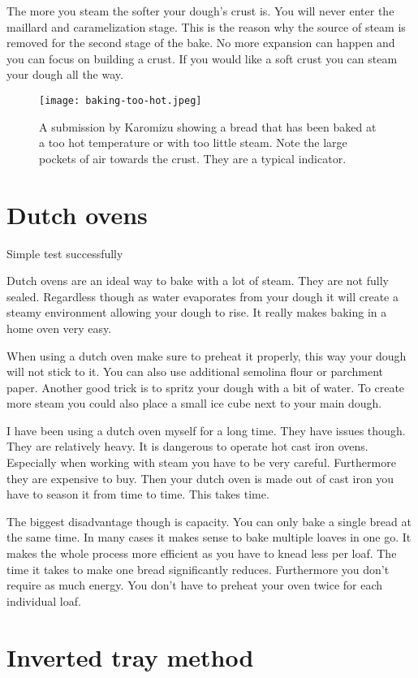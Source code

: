 The more you steam the softer your dough's crust is. You will never
enter the maillard and caramelization stage. This
is the reason why the source of steam is removed
for the second stage of the bake. No more expansion can
happen and you can focus on building a crust. If you
would like a soft crust you can steam your dough all the
way.

\begin{figure}[!htb]
  \texttt{[image: baking-too-hot.jpeg]}
  \caption{A submission by Karomizu showing a bread that has been baked
  at a too hot temperature or with too little steam. Note the large
  pockets of air towards the crust. They are a typical indicator.}
\end{figure}

\section{Dutch ovens}

Simple test successfully

Dutch ovens are an ideal way to bake with a lot of
steam. They are not fully sealed. Regardless though
as water evaporates from your dough it will create a steamy
environment allowing your dough to rise. It really
makes baking in a home oven very easy.

When using a dutch oven make sure to preheat it properly,
this way your dough will not stick to it. You can also
use additional semolina flour or parchment paper. Another
good trick is to spritz your dough with a bit of water.
To create more steam you could also place a small ice cube
next to your main dough.

I have been using a dutch oven myself for a long time. They
have issues though. They are relatively heavy. It is dangerous
to operate hot cast iron ovens. Especially when working with steam
you have to be very careful.  Furthermore
they are expensive to buy. Then your dutch oven is made out
of cast iron you have to season it from time to time. This takes
time.

The biggest disadvantage though is
capacity. You can only bake a single bread at the
same time. In many cases it makes sense to bake multiple
loaves in one go. It makes the whole process more
efficient as you have to knead less per loaf. The time it
takes to make one bread significantly reduces. Furthermore
you don't require as much energy. You don't have
to preheat your oven twice for each individual loaf.


\section{Inverted tray method}

